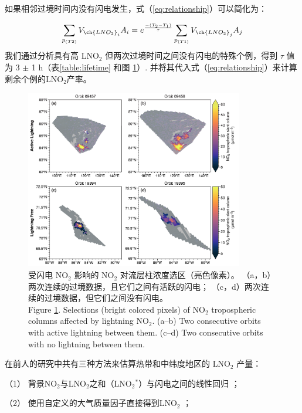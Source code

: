 如果相邻过境时间内没有闪电发生，式（\ref{eq:relationship}）可以简化为：

\begin{equation} \label{eq:LNO2_nolightning}
\sum_{p_{(T2)}} V_{\ch{LNO_2}_i} A_{i} = e^\frac{{-(T_2-T_1)}}{\tau} \sum_{p_{(T1)}} V_{\ch{LNO_2}_j} A_{j}
\end{equation}
我们通过分析具有高 LNO$_2$ 但两次过境时间之间没有闪电的特殊个例，得到 $\tau$ 值为 3 $\pm$ 1 h（表\ref{table:lifetime} 和图 \ref{fig:consecutive_orbits}）.
并将其代入式（\ref{eq:relationship}）来计算剩余个例的LNO$_2$产率。


\begin{figure}[H]
\centering
\includegraphics[width=0.85\textwidth]{./figures/arctic_consecutive_orbits.png}
\caption{
受闪电 NO$_2$ 影响的 NO$_2$ 对流层柱浓度选区（亮色像素）。
（a，b）两次连续的过境数据，且它们之间有活跃的闪电；
（c，d）两次连续的过境数据，但它们之间没有闪电。\\
Figure \ref{fig:consecutive_orbits}.
Selections (bright colored pixels) of NO$_2$ tropospheric columns affected by lightning NO$_2$.
(a--b) Two consecutive orbits with active lightning between them.
(c--d) Two consecutive orbits with no lightning between them.
}
\label{fig:consecutive_orbits}
\end{figure}


在前人的研究中共有三种方法来估算热带和中纬度地区的 LNO$_2$ 产量：

（1） 背景NO$_2$与LNO$_2$之和（LNO$_2$$^*$）与闪电之间的线性回归 \citep{Pickering.2016,Allen.2019,Lapierre.2020}；

（2） 使用自定义的大气质量因子直接得到LNO$_2$ \citep{Beirle.2009,Zhang.2020b,Zhang.2022a}；

